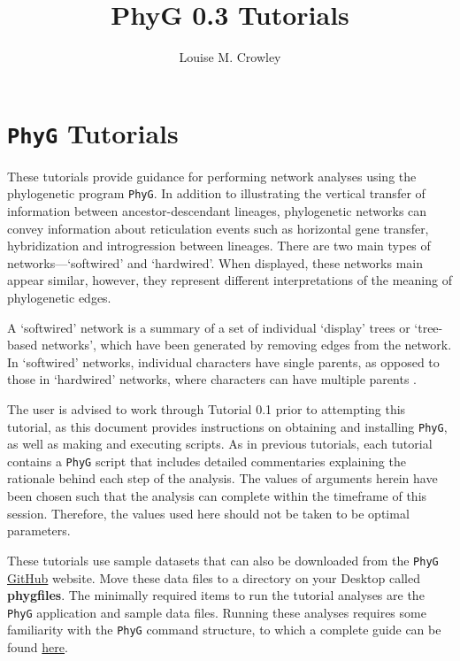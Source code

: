 \documentclass[11pt]{article}
\title{PhyG 0.3 Tutorials}
\author{Louise M. Crowley}
\newcommand{\phyg}{\texttt{PhyG} }
\begin{document}
\maketitle

\section{\phyg Tutorials}

These tutorials provide guidance for performing network analyses using the 
phylogenetic program \texttt{PhyG}. In addition to illustrating the vertical transfer 
of information between ancestor-descendant lineages, phylogenetic networks 
can convey information about reticulation events such as horizontal gene transfer, 
hybridization and introgression between lineages. There are two main types of 
networks---`softwired' and `hardwired'. When displayed, these networks main 
appear similar, however, they represent different interpretations of the meaning 
of phylogenetic edges.

A `softwired' network is a summary of a set of individual `display' trees or `tree-based 
networks', which have been generated by removing edges from the network.
In `softwired' networks, individual characters have single parents, as opposed 
to those in `hardwired' networks, where characters can have multiple parents 
\citep{KannanandWheeler2012}.

The user is advised to work through Tutorial 0.1 prior to attempting this tutorial, 
as this document provides instructions on obtaining and installing \texttt{PhyG}, 
as well as making and executing scripts. As in previous tutorials, each tutorial 
contains a \phyg script that includes detailed commentaries explaining the 
rationale behind each step of the analysis. The values of arguments herein have 
been chosen such that the analysis can complete within the timeframe of this 
session. Therefore, the values used here should not be taken to be optimal 
parameters. 

These tutorials use sample datasets that can also be downloaded from the 
\texttt{PhyG} \href{https://github.com/amnh/PhyGraph}{GitHub} website. Move 
these data files to a directory on your Desktop called \textbf{phygfiles}. The 
minimally required items to run the tutorial analyses are the \phyg application 
and sample data files. Running these analyses requires some familiarity with 
the \phyg command structure, to which a complete guide can be found 
\href{https://github.com/amnh/PhyGraph}{here}.
\end{document}
